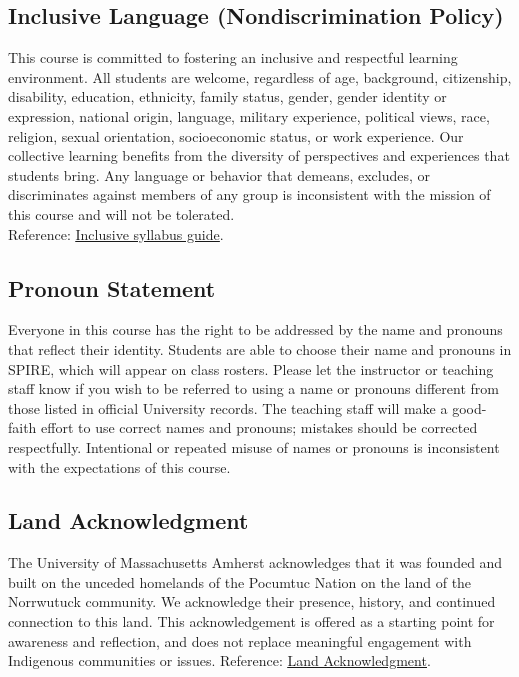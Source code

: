 \documentclass[11pt]{article}
\newcommand{\link}[2]{\href{#1}{\uline{#2}}}
\begin{document}
\subsection*{Inclusive Language (Nondiscrimination Policy)}
This course is committed to fostering an inclusive and respectful learning environment. All students are welcome, regardless of age, background, citizenship, disability, education, ethnicity, family status, gender, gender identity or expression, national origin, language, military experience, political views, race, religion, sexual orientation, socioeconomic status, or work experience. Our collective learning benefits from the diversity of perspectives and experiences that students bring. Any language or behavior that demeans, excludes, or discriminates against members of any group is inconsistent with the mission of this course and will not be tolerated. \\
Reference: \link{https://www.umass.edu/ctl/resources/how-do-i/how-do-i-write-inclusive-syllabus}{Inclusive syllabus guide}.

\subsection*{Pronoun Statement}
Everyone in this course has the right to be addressed by the name and pronouns that reflect their identity. Students are able to choose their name and pronouns in SPIRE, which will appear on class rosters. Please let the instructor or teaching staff know if you wish to be referred to using a name or pronouns different from those listed in official University records. The teaching staff will make a good-faith effort to use correct names and pronouns; mistakes should be corrected respectfully. Intentional or repeated misuse of names or pronouns is inconsistent with the expectations of this course.

\subsection*{Land Acknowledgment}
The University of Massachusetts Amherst acknowledges that it was founded and built on the unceded homelands of the Pocumtuc Nation on the land of the Norrwutuck community. We acknowledge their presence, history, and continued connection to this land. This acknowledgement is offered as a starting point for awareness and reflection, and does not replace meaningful engagement with Indigenous communities or issues.
Reference: \link{https://www.umass.edu/diversity/about/land-acknowledgement}{Land Acknowledgment}. 
\end{document}

